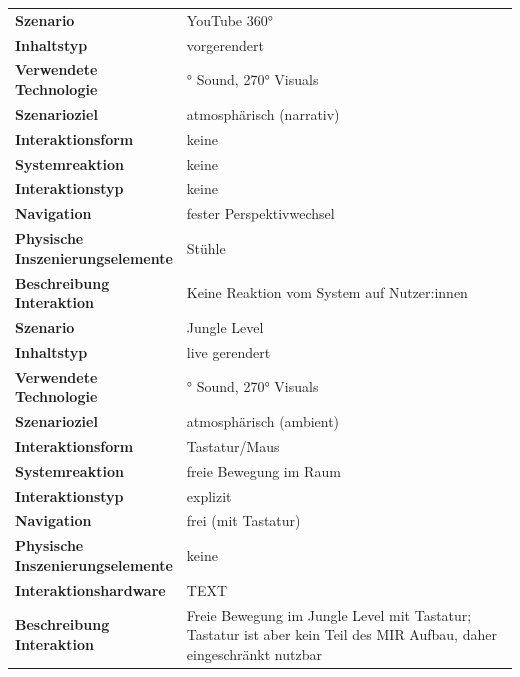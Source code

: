 \begin{longtable} {>{\raggedright\arraybackslash}p{0.3\linewidth}
    >{\raggedright\arraybackslash}p{0.7\linewidth}}
    \textbf{Szenario} & YouTube 360° \\
    \textbf{Inhaltstyp} & vorgerendert \\
    \textbf{Verwendete Technologie} & 360° Sound, 270° Visuals \\
    \textbf{Szenarioziel} & atmosphärisch (narrativ) \\
    \textbf{Interaktionsform} & keine \\
    \textbf{Systemreaktion} & keine \\
    \textbf{Interaktionstyp} & keine \\
    \textbf{Navigation} & fester Perspektivwechsel \\
    \textbf{Physische Inszenierungselemente} & Stühle \\
    \textbf{Beschreibung Interaktion} & Keine Reaktion vom System auf Nutzer:innen \\[0.8em]
    \midrule

    \textbf{Szenario} & Jungle Level \\
    \textbf{Inhaltstyp} & live gerendert \\
    \textbf{Verwendete Technologie} & 360° Sound, 270° Visuals \\
    \textbf{Szenarioziel} & atmosphärisch (ambient) \\
    \textbf{Interaktionsform} & Tastatur/Maus \\
    \textbf{Systemreaktion} & freie Bewegung im Raum \\
    \textbf{Interaktionstyp} & explizit \\
    \textbf{Navigation} & frei (mit Tastatur) \\
    \textbf{Physische Inszenierungselemente} & keine \\
    \textbf{Interaktionshardware} & TEXT \\
    \textbf{Beschreibung Interaktion} & Freie Bewegung im Jungle Level mit Tastatur; Tastatur ist aber kein Teil des MIR Aufbau, daher eingeschränkt nutzbar \\[0.8em]
    \midrule


\end{longtable}
